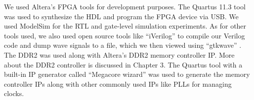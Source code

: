 We used Altera's FPGA tools for development purposes. The Quartus 11.3 tool \cite{quartus} was used to synthesize the HDL and program the FPGA device via USB. We used ModelSim for the RTL and gate-level simulation experiments. As for other tools used, we also used open source tools like ``iVerilog'' \cite{iverilog} to compile our Verilog code and dump wave signals to a file, which we then viewed using ``gtkwave'' \cite{gtkwave}. The DDR2 was used along with Altera's DDR2 memory controller IP. More about the DDR2 controller is discussed in Chapter 3. The Quartus tool with a built-in IP generator called ``Megacore wizard'' was used to generate the memory controller IPs along with other commonly used IPs like PLLs for managing clocks.

